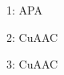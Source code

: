 \documentclass{article}
\begin{document}
1: \Acl{APA}

2: \Acs{CuAAC}

3: \Acl{CuAAC}
\end{document}
